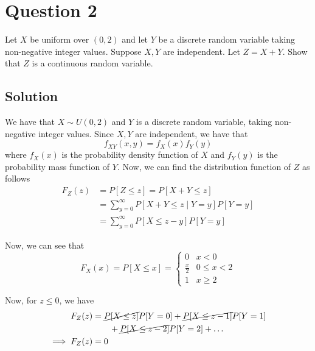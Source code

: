 \section*{Question 2}

Let \( X \) be uniform over \( (0,2) \) and let \( Y \) be a discrete random variable taking non-negative integer values.
Suppose \( X, Y \) are independent.
Let \( Z=X+Y \).
Show that \( Z \) is a continuous random variable.

\subsection*{Solution}

We have that \( X \sim U(0,2) \) and \( Y \) is a discrete random variable, taking non-negative integer values.
Since \( X, Y \) are independent, we have that
\begin{equation*}
    f_{XY}(x, y)
    =
    f_{X}(x) f_{Y}(y)
\end{equation*}
where \( f_{X}(x) \) is the probability density function of \( X \) and \( f_{Y}(y) \) is the probability mass function of \( Y \).
Now, we can find the distribution function of \( Z \) as follows
\begin{align*}
    F_{Z}(z)
     & =
    P[Z \leq z]
    =
    P[X+Y \leq z]
    \\ & =
    \sum_{y=0}^{\infty} P[X+Y \leq z \mid Y=y] P[Y=y]
    \\ & =
    \sum_{y=0}^{\infty} P[X \leq z-y] P[Y=y]
\end{align*}

Now, we can see that
\begin{equation*}
    F_{X}(x)
    =
    P[X \leq x]
    =
    \begin{cases}
        0           & x < 0        \\
        \frac{x}{2} & 0 \leq x < 2 \\
        1           & x \geq 2
    \end{cases}
\end{equation*}

Now, for \( z \leq 0 \), we have
\begin{align*}
    F_{Z}(z)
     & =
    \cancel{P[X \leq z]} P[Y = 0]
    +
    \cancel{P[X \leq z-1]} P[Y = 1]
    \\ & \qquad +
    \cancel{P[X \leq z-2]} P[Y = 2]
    +
    \ldots
    \\
    \implies
    F_{Z}(z)
     & =
    0
\end{align*}

